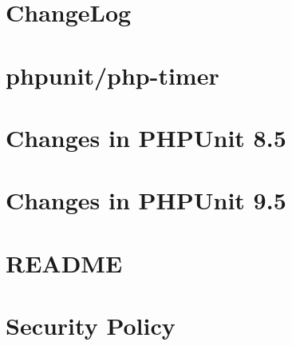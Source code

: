 \documentclass[twoside]{book}
\newcommand{\+}{\discretionary{\mbox{\scriptsize$\hookleftarrow$}}{}{}}
\begin{document}
\chapter{Change\+Log}
\label{md__c__workspace__proyecto__p_h_p_project_vendor_phpunit_php_timer__change_log}

\chapter{phpunit/php-\/timer}
\label{md__c__workspace__proyecto__p_h_p_project_vendor_phpunit_php_timer__r_e_a_d_m_e}

\chapter{Changes in PHPUnit 8.5}
\label{md__c__workspace__proyecto__p_h_p_project_vendor_phpunit_phpunit__change_log_8_5}

\chapter{Changes in PHPUnit 9.5}
\label{md__c__workspace__proyecto__p_h_p_project_vendor_phpunit_phpunit__change_log_9_5}

\chapter{README}
\label{md__c__workspace__proyecto__p_h_p_project_vendor_phpunit_phpunit__r_e_a_d_m_e}

\chapter{Security Policy}
\label{md__c__workspace__proyecto__p_h_p_project_vendor_phpunit_phpunit__s_e_c_u_r_i_t_y}

\end{document}
